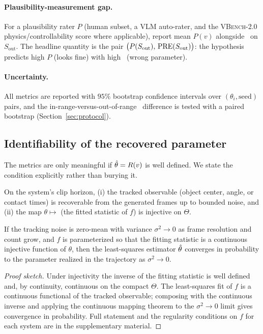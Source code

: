 \documentclass[10pt,twocolumn,letterpaper]{article}
\begin{document}
\paragraph{Plausibility-measurement gap.}
For a plausibility rater $P$ (human subset, a VLM auto-rater, and the
\textsc{VBench-2.0} physics/controllability score \citep{vbench2_2025} where
applicable), report mean $P(v)$ alongside \PRE\ on $S_\text{out}$. The headline
quantity is the pair $\big(P(S_\text{out}),\,\mathrm{PRE}(S_\text{out})\big)$: the
hypothesis predicts high $P$ (looks fine) with high \PRE\ (wrong parameter).

\paragraph{Uncertainty.}
All metrics are reported with $95\%$ bootstrap confidence intervals over
$(\theta_i,\text{seed})$ pairs, and the in-range-versus-out-of-range \PRE\
difference is tested with a paired bootstrap (Section~\ref{sec:protocol}).

\subsection{Identifiability of the recovered parameter}

The metrics are only meaningful if $\hat{\theta}=R(v)$ is well defined. We state the
condition explicitly rather than burying it.

\begin{assumption}
\label{ass:ident}
On the system's clip horizon, (i) the tracked observable (object center,
angle, or contact times) is recoverable from the generated frames up to bounded
noise, and (ii) the map $\theta \mapsto$ (the fitted statistic of $f$) is
injective on $\Theta$.
\end{assumption}

\begin{proposition}[Consistency of $R$ under Assumption~\ref{ass:ident}]
\label{prop:consistency}
If the tracking noise is zero-mean with variance $\sigma^2\to 0$ as frame
resolution and count grow, and $f$ is parameterized so that the fitting
statistic is a continuous injective function of $\theta$, then the
least-squares estimator $\hat{\theta}$ converges in probability to the parameter
realized in the trajectory as $\sigma^2\to 0$.
\end{proposition}

\begin{proof}[Proof sketch]
Under injectivity the inverse of the fitting statistic is well defined and, by
continuity, continuous on the compact $\Theta$. The least-squares fit of $f$ is
a continuous functional of the tracked observable; composing with the
continuous inverse and applying the continuous mapping theorem to the
$\sigma^2\to 0$ limit gives convergence in probability. Full statement and the
regularity conditions on $f$ for each system are in the supplementary material.
\end{proof}
\end{document}
